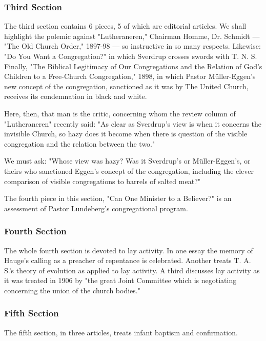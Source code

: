 
\subsubsection{Third Section}

The third section contains 6 pieces, 5 of which are editorial articles. We shall highlight the polemic against "Lutheraneren," Chairman Homme, Dr. Schmidt — "The Old Church Order," 1897-98 — so instructive in so many respects. Likewise: "Do You Want a Congregation?" in which Sverdrup crosses swords with T. N. S. Finally, "The Biblical Legitimacy of Our Congregations and the Relation of God’s Children to a Free-Church Congregation," 1898, in which Pastor Müller-Eggen’s new concept of the congregation, sanctioned as it was by The United Church, receives its condemnation in black and white.

Here, then, that man is the critic, concerning whom the review column of "Lutheraneren" recently said: "As clear as Sverdrup’s view is when it concerns the invisible Church, so hazy does it become when there is question of the visible congregation and the relation between the two."

We must ask: "Whose view was hazy? Was it Sverdrup’s or Müller-Eggen’s, or theirs who sanctioned Eggen’s concept of the congregation, including the clever comparison of visible congregations to barrels of salted meat?"

The fourth piece in this section, "Can One Minister to a Believer?" is an assessment of Pastor Lundeberg’s congregational program.

\subsubsection{Fourth Section}

The whole fourth section is devoted to lay activity. In one essay the memory of Hauge’s calling as a preacher of repentance is celebrated. Another treats T. A. S.’s theory of evolution as applied to lay activity. A third discusses lay activity as it was treated in 1906 by "the great Joint Committee which is negotiating concerning the union of the church bodies."

\subsubsection{Fifth Section}

The fifth section, in three articles, treats infant baptism and confirmation.

